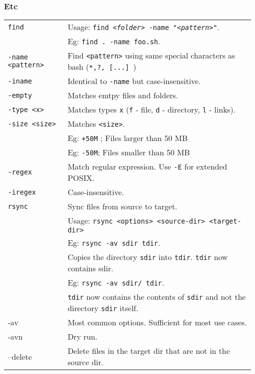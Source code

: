 \subsubsection{Etc}

\begin{tabularx}{\linewidth}{lX}
    \texttt{find}               & Usage: \texttt{find \textit{<folder>} -name "\textit{<pattern>}"}.\\
                                & Eg: \texttt{find . -name foo.sh}.\\
    \texttt{-name <pattern>}    & Find \texttt{<pattern>} using same special characters as bash (\texttt{*,?, [...] })\\
    \texttt{-iname}             & Identical to \texttt{-name} but case-insensitive.\\
    \texttt{-empty}             & Matches emtpy files and folders.\\
    \texttt{-type <x>}          & Matches types \texttt{x} (\texttt{f} - file, \texttt{d} - directory, \texttt{l} - links).\\
    \texttt{-size <size>}       & Matches \texttt{<size>}.\\
                                &  Eg: \texttt{+50M} ; Files larger than 50 MB\\
                                & Eg: \texttt{-50M}; Files smaller than 50 MB\\
    \texttt{-regex}             & Match regular expression. Use \texttt{-E} for extended POSIX.\\
    \texttt{-iregex}            & Case-insensitive.\\
    \hline

    \texttt{rsync}              & Sync files from source to target.\\
                                & Usage: \texttt{rsync <options> <source-dir> <target-dir>}\\
                                & Eg: \texttt{rsync -av sdir tdir}.\\
                                & Copies the directory \texttt{sdir} into \texttt{tdir}. \texttt{tdir} now contains sdir.\\
                                & Eg: \texttt{rsync -av sdir/ tdir}.\\
                                & \texttt{tdir} now contains the contents of \texttt{sdir} and not the directory \texttt{sdir} itself.\\
    -av                         & Most common options. Sufficient for most use cases.\\
    -avn                        & Dry run.\\
    --delete                    & Delete files in the target dir that are not in the source dir.\\
    \hline
    

\end{tabularx}
